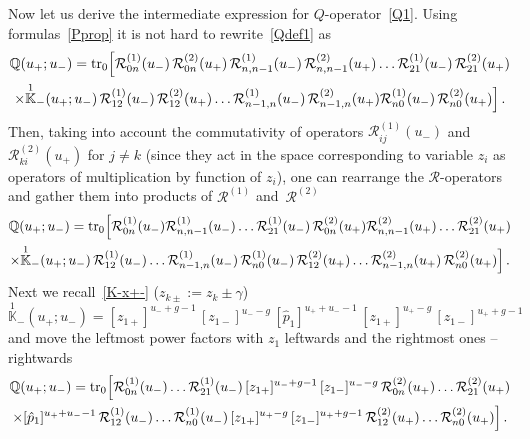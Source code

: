 \documentclass[a4paper,11pt]{article}
\newcommand{\tr}{\mathop{\rm tr}\nolimits}
\numberwithin{equation}{section}
\begin{document}
Now let us derive the intermediate expression for $Q$-operator~\eqref{Q1}.
Using formulas~\eqref{Pprop}
it is not hard to rewrite~\eqref{Qdef1} as
\begin{multline} \nonumber
	\mathbb{Q}(u_+;u_-)
	= \tr_0\Bigl[
	\mathcal{R}^{(1)}_{0n}(u_-)\,\mathcal{R}^{(2)}_{0n}(u_+)\,
	\mathcal{R}^{(1)}_{n,n-1}(u_-)\,\mathcal{R}^{(2)}_{n,n-1}(u_+) \dots \mathcal{R}^{(1)}_{21}(u_-)\,\mathcal{R}^{(2)}_{21}(u_+) \\
	\times
	\overset{1}{\mathbb{K}}_-(u_+;u_-)\,\mathcal{R}^{(1)}_{12}(u_-)\,\mathcal{R}^{(2)}_{12}(u_+)\dots
	\mathcal{R}^{(1)}_{n-1,n}(u_-)\,\mathcal{R}^{(2)}_{n-1,n}(u_+)
	\mathcal{R}^{(1)}_{n0}(u_-)\,\mathcal{R}^{(2)}_{n0}(u_+)\Bigr] \,.
\end{multline}
Then, taking into account the commutativity of operators $\mathcal{R}^{(1)}_{ij}(u_-)$ and $\mathcal{R}^{(2)}_{ki}(u_+)$ for $j \neq k$ (since they act in the space corresponding to variable $z_i$ as operators of multiplication by function of $z_i$), one can rearrange the $\mathcal{R}$-operators and gather them into products of $\mathcal{R}^{(1)}$ and~$\mathcal{R}^{(2)}$
\begin{multline}
	\nonumber
	\mathbb{Q}(u_+;u_-)
	= \tr_0\Bigl[ 
	\mathcal{R}^{(1)}_{0n}(u_-)\mathcal{R}^{(1)}_{n,n-1}(u_-)\dots\mathcal{R}^{(1)}_{21}(u_-)\,\mathcal{R}^{(2)}_{0n}(u_+)\mathcal{R}^{(2)}_{n,n-1}(u_+)\dots\mathcal{R}^{(2)}_{21}(u_+)  \\
	\times
	\overset{1}{\mathbb{K}}_-(u_+;u_-) \,
	\mathcal{R}^{(1)}_{12}(u_-)\dots
	\mathcal{R}^{(1)}_{n-1,n}(u_-)\,
	\mathcal{R}^{(1)}_{n0}(u_-)\,\mathcal{R}^{(2)}_{12}(u_+)\dots\mathcal{R}^{(2)}_{n-1,n}(u_+)\,\mathcal{R}^{(2)}_{n0}(u_+)\Bigr] \,.
\end{multline}
Next we recall~\eqref{K-x+-} ($z_{k\pm}:=z_k\pm\gamma$)
\begin{equation} \nonumber
	\overset{1}{\mathbb{K}}_-(u_+;u_-) = [z_{1+}]^{u_-+g-1}\,[z_{1-}]^{u_--g}\,[\hat{p}_1]^{u_++u_--1}\,[z_{1+}]^{u_+-g}\,[z_{1-}]^{u_++g-1}
\end{equation}
and move the leftmost power factors with $z_1$ leftwards and the rightmost ones -- rightwards
\begin{multline}
	\nonumber
	\mathbb{Q}(u_+;u_-)
	= \tr_0\Bigl[ 
	\mathcal{R}^{(1)}_{0n}(u_-)\dots\mathcal{R}^{(1)}_{21}(u_-)\,[z_{1+}]^{u_-+g-1}\,[z_{1-}]^{u_--g}\,\mathcal{R}^{(2)}_{0n}(u_+)\dots\mathcal{R}^{(2)}_{21}(u_+)  \\
	\times
	[\hat{p}_1]^{u_++u_--1} \,
	\mathcal{R}^{(1)}_{12}(u_-)\dots
	\mathcal{R}^{(1)}_{n0}(u_-)\,[z_{1+}]^{u_+-g}\,[z_{1-}]^{u_++g-1}\,\mathcal{R}^{(2)}_{12}(u_+)\dots\mathcal{R}^{(2)}_{n0}(u_+)\Bigr] \,.
\end{multline}
\end{document}
